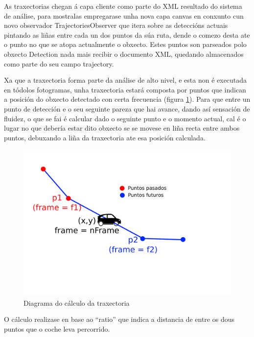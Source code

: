     As traxectorias chegan á capa cliente como parte do XML resultado do sistema de análise, para 
    mostralas empregarase unha nova capa canvas en conxunto cun novo observador 
    TrajectoriesObserver que itera sobre as deteccións actuais pintando as liñas entre cada un dos
    puntos da súa ruta, dende o comezo desta ate o punto no que se atopa actualmente o obxecto. 
    Estes puntos son parseados polo obxecto Detection nada mais recibir o documento XML, quedando
    almacenados como parte do seu campo trajectory.
    
    Xa que a traxectoria forma parte da análise de alto nivel, e esta 
    non é executada en tódolos fotogramas, unha traxectoria estará composta por puntos que indican a
    posición do obxecto detectado con certa frecuencia (figura \ref{fig:calcTrajectory}).
    Para que entre un punto de detección e o seu
    seguinte pareza que hai avance, dando así sensación de fluidez, o que se fai é calcular dado o
    seguinte punto e o momento actual, cal é o lugar no que debería estar dito obxecto se se movese
    en liña recta entre ambos puntos, debuxando a liña da traxectoria ate esa posición calculada.
    
    \begin{figure}[htp]
    \begin{center}
        \includegraphics[scale=0.4]{figures/calcTrajectory.pdf}
        \caption{Diagrama do cálculo da traxectoria}
    \label{fig:calcTrajectory}
    \end{center}
    \end{figure}
    
    O cálculo realizase en base ao ``ratio'' que indica a distancia de entre os dous puntos que o coche 
    leva percorrido.
    
